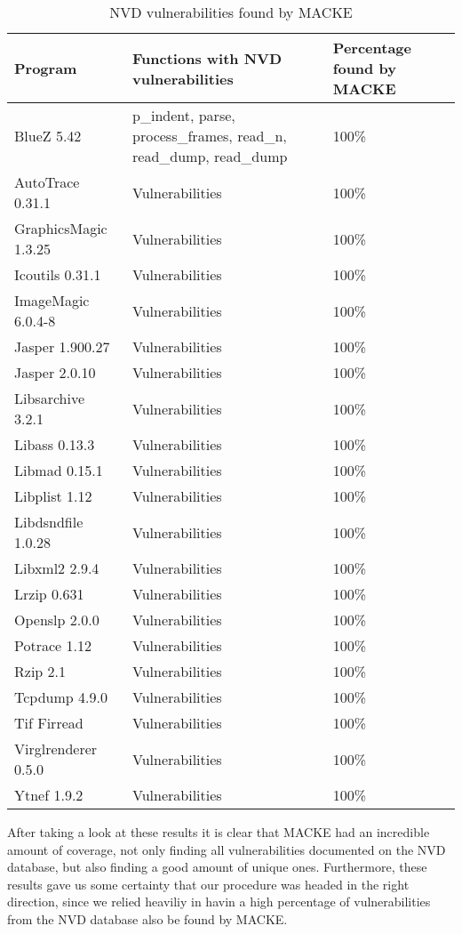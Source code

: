  \begin{table}[H]
	\centering
	\caption{NVD vulnerabilities found by MACKE}
	\begin{tabular}{ |p{4cm}||p{5cm}||p{4cm}|  }
		\hline
		Program & Functions with NVD vulnerabilities & Percentage found by MACKE\\
		\hline
		BlueZ 5.42   & p\_indent, parse, process\_frames, read\_n, read\_dump, read\_dump & 100\% \\ 
		AutoTrace 0.31.1 &   Vulnerabilities & 100\% \\
		GraphicsMagic 1.3.25 & Vulnerabilities & 100\% \\
		Icoutils 0.31.1    & Vulnerabilities & 100\% \\
		ImageMagic 6.0.4-8    & Vulnerabilities & 100\% \\
		Jasper 1.900.27    & Vulnerabilities & 100\% \\
		Jasper 2.0.10    & Vulnerabilities & 100\% \\
		Libsarchive 3.2.1	& Vulnerabilities & 100\% \\
		Libass 0.13.3	& Vulnerabilities & 100\% \\
		Libmad 0.15.1	& Vulnerabilities & 100\% \\
		Libplist 1.12	& Vulnerabilities & 100\% \\
		Libdsndfile 1.0.28	& Vulnerabilities & 100\% \\
		Libxml2 2.9.4	& Vulnerabilities & 100\% \\
		Lrzip 0.631	& Vulnerabilities & 100\% \\
		Openslp 2.0.0	& Vulnerabilities & 100\% \\
		Potrace 1.12	& Vulnerabilities & 100\% \\
		Rzip 2.1	& Vulnerabilities & 100\% \\
		Tcpdump 4.9.0	& Vulnerabilities & 100\% \\
		Tif Firread	& Vulnerabilities & 100\% \\
		Virglrenderer 0.5.0	& Vulnerabilities & 100\% \\
		Ytnef 1.9.2	& Vulnerabilities & 100\% \\
		\hline
	\end{tabular}
\end{table}

After taking a look at these results it is clear that MACKE had an incredible amount of coverage, not only finding all vulnerabilities documented on the NVD database, but also finding a good amount of unique ones. Furthermore, these results gave us some certainty that our procedure was headed in the right direction, since we relied heaviliy in havin a high percentage of vulnerabilities from the NVD database also be found by MACKE.

